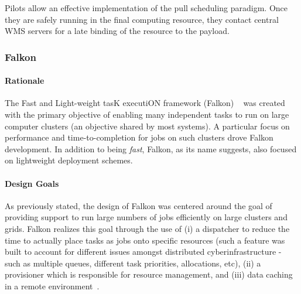 \documentclass{sig-alternate}
\begin{document}
Pilots allow an effective implementation of the pull scheduling paradigm. Once
they are safely running in the final computing resource, they contact central
WMS servers for a late binding of the resource to the payload.



\subsubsection{Falkon}


\paragraph{Rationale}
The Fast and Light-weight tasK executiON framework (Falkon)
~\cite{1362680} was created with the primary objective
of enabling many independent tasks to run on large computer
clusters (an objective shared by most \pilotjob systems).
A particular focus on performance and time-to-completion for jobs
on such clusters drove Falkon development. In
addition to being \textit{fast}, Falkon, as its name suggests,
also focused on lightweight deployment schemes.

\paragraph{Design Goals}
As previously stated, the design of Falkon was centered
around the goal of providing support to run large numbers
of jobs efficiently on large clusters and grids. Falkon
realizes this goal through the use of (i) a
dispatcher to reduce the time to actually place
tasks as jobs onto specific resources (such a feature
was built to account for different issues amongst
distributed cyberinfrastructure - such as multiple
queues, different task priorities, allocations, etc),
(ii) a provisioner which is responsible for
resource management, and (iii) data caching in
a remote environment~\cite{1362680}.
\end{document}
